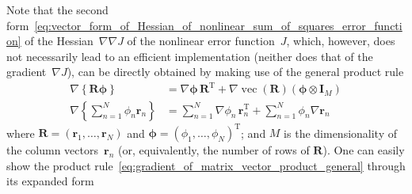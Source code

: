 \documentclass[12pt,a4paper]{article}
\begin{document}
Note that
the second form~\eqref{eq:vector_form_of_Hessian_of_nonlinear_sum_of_squares_error_function}
of the Hessian~$\nabla\nabla J$ of the nonlinear error function~$J$,
which, however, does not necessarily lead to an efficient implementation
(neither does that of the gradient~$\nabla J$),
can be directly obtained by making use of the general product rule
\begin{align}
\nabla \left\{ \mathbf{R} \bm{\phi} \right\}
&= \nabla \bm{\phi} \, \mathbf{R}^{\operatorname{T}}
+ \nabla \operatorname{vec}\left( \mathbf{R} \right)
\left( \bm{\phi} \otimes \mathbf{I}_M \right)
\label{eq:gradient_of_matrix_vector_product_general}
\\
\nabla \left\{ \sum_{n=1}^{N} \phi_n \mathbf{r}_n \right\}
&= \sum_{n=1}^{N} \nabla \phi_n \, \mathbf{r}_n^{\operatorname{T}}
+ \sum_{n=1}^{N} \phi_n \nabla \mathbf{r}_n
\label{eq:gradient_of_matrix_vector_product_general_expanded_form}
\end{align}
where $\mathbf{R} = \left(\mathbf{r}_1, \dots, \mathbf{r}_N\right)$ and
$\bm{\phi} = \left(\phi_1, \dots, \phi_N\right)^{\operatorname{T}}$; and
$M$ is the dimensionality of the column vectors~$\mathbf{r}_n$
(or, equivalently, the number of rows of $\mathbf{R}$).
One can easily show the product rule~\eqref{eq:gradient_of_matrix_vector_product_general}
through its expanded form~%
\end{document}
